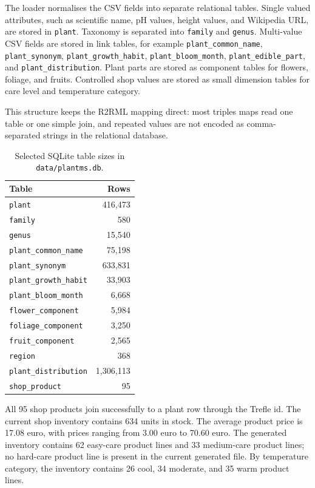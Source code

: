 \documentclass[11pt,a4paper]{article}
\newcommand{\artifact}[1]{\texttt{#1}}
\begin{document}
The loader normalises the CSV fields into separate relational tables. Single
valued attributes, such as scientific name, pH values, height values, and
Wikipedia URL, are stored in \artifact{plant}. Taxonomy is separated into
\artifact{family} and \artifact{genus}. Multi-value CSV fields are stored in
link tables, for example \artifact{plant\_common\_name},
\artifact{plant\_synonym}, \artifact{plant\_growth\_habit},
\artifact{plant\_bloom\_month}, \artifact{plant\_edible\_part}, and
\artifact{plant\_distribution}. Plant parts are stored as component tables for
flowers, foliage, and fruits. Controlled shop values are stored as small
dimension tables for care level and temperature category.

This structure keeps the R2RML mapping direct: most triples maps read one table
or one simple join, and repeated values are not encoded as comma-separated
strings in the relational database.

\begin{table}[h]
\centering
\begin{tabular}{lr}
\toprule
Table & Rows \\
\midrule
\artifact{plant} & 416,473 \\
\artifact{family} & 580 \\
\artifact{genus} & 15,540 \\
\artifact{plant\_common\_name} & 75,198 \\
\artifact{plant\_synonym} & 633,831 \\
\artifact{plant\_growth\_habit} & 33,903 \\
\artifact{plant\_bloom\_month} & 6,668 \\
\artifact{flower\_component} & 5,984 \\
\artifact{foliage\_component} & 3,250 \\
\artifact{fruit\_component} & 2,565 \\
\artifact{region} & 368 \\
\artifact{plant\_distribution} & 1,306,113 \\
\artifact{shop\_product} & 95 \\
\bottomrule
\end{tabular}
\caption{Selected SQLite table sizes in \artifact{data/plantms.db}.}
\label{tab:sqlite-table-sizes}
\end{table}

All 95 shop products join successfully to a plant row through the Trefle id. The
current shop inventory contains 634 units in stock. The average product price is
17.08 euro, with prices ranging from 3.00 euro to 70.60 euro. The generated
inventory contains 62 easy-care product lines and 33 medium-care product lines;
no hard-care product line is present in the current generated file. By
temperature category, the inventory contains 26 cool, 34 moderate, and 35 warm
product lines.
\end{document}
